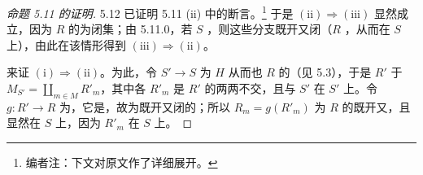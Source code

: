\begin{proof}[命题 5.11 的证明]
 5.12 已证明 5.11 (ii) 中的断言。\footnote[41]{编者注：下文对原文作了详细展开。} 于是 $(\mathrm{ii})\Rightarrow(\mathrm{iii})$ 显然成立，因为 $R$ 的为闭集；由 5.11.0，若 $S$ ，则这些分支既开又闭（$R$ ，从而在 $S$ 上），由此在该情形得到 $(\mathrm{iii})\Rightarrow(\mathrm{ii})$。

来证 $(\mathrm i)\Rightarrow(\mathrm{ii})$。为此，令 $S'\to S$ 为 $H$ 从而也 $R$ 的（见 5.3），于是 $R'$ 于 $M_{S'}=\coprod_{m\in M}R'_m$，其中各 $R'_m$ 是 $R'$ 的两两不交，且与 $S'$ 在 $S'$ 上。令 $g:R'\to R$ 为，它是，故为既开又闭的；所以 $R_m=g(R'_m)$ 为 $R$ 的既开又，且显然在 $S$ 上，因为 $R'_m$ 在 $S$ 上。


\end{proof}
